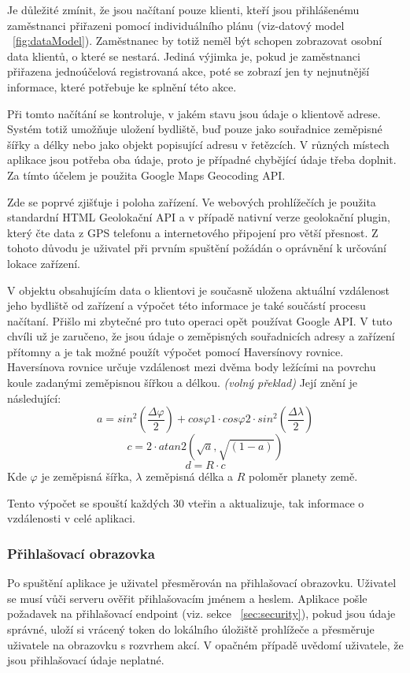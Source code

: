 \documentclass[
  glossaries,
]{kidiplom}
\begin{document}
Je důležité zmínit, že jsou načítaní pouze klienti, kteří jsou přihlášenému zaměstnanci přiřazeni pomocí individuálního plánu (viz-datový model ~\ref{fig:dataModel}). Zaměstnanec by totiž neměl být schopen zobrazovat osobní data klientů, o které se nestará. Jediná výjimka je, pokud je zaměstnanci přiřazena jednoúčelová registrovaná akce, poté se zobrazí jen ty nejnutnější informace, které potřebuje ke splnění této akce.

Při tomto načítání se kontroluje, v jakém stavu jsou údaje o klientově adrese. Systém totiž umožňuje uložení bydliště, buď pouze jako souřadnice zeměpisné šířky a délky nebo jako objekt popisující adresu v řetězcích. V různých místech aplikace jsou potřeba oba údaje, proto je případné chybějící údaje třeba doplnit. Za tímto účelem je použita Google Maps Geocoding API. 

Zde se poprvé zjišťuje i poloha zařízení. Ve webových prohlížečích je použita standardní HTML Geolokační API a v případě nativní verze geolokační plugin, který čte data z GPS telefonu a internetového připojení pro větší přesnost. Z tohoto důvodu je uživatel při prvním spuštění požádán o oprávnění k určování lokace zařízení.

V objektu obsahujícím data o klientovi je současně uložena aktuální vzdálenost jeho bydliště od zařízení a výpočet této informace je také součástí procesu načítaní. Přišlo mi zbytečné pro tuto operaci opět používat Google API. V tuto chvíli už je zaručeno, že jsou údaje o zeměpisných souřadnicích adresy a zařízení přítomny a je tak možné použít výpočet pomocí Haversínovy rovnice. Haversínova rovnice určuje vzdálenost mezi dvěma body ležícími na povrchu koule zadanými zeměpisnou šířkou a délkou. \cite{16} \textit{(volný překlad)} Její znění \cite{17} je následující:
$$a = sin^2(\frac{\Delta\varphi}{2}) + cos\varphi1 \cdot cos\varphi2 \cdot sin^2(\frac{\Delta\lambda}{2})$$
$$c = 2 \cdot atan2(\sqrt{a},\sqrt{(1 - a)})$$
$$ d = R \cdot c$$
Kde $\varphi$ je zeměpisná šířka, $\lambda$ zeměpisná délka a $R$ poloměr planety země.

 Tento výpočet se spouští každých 30 vteřin a aktualizuje, tak informace o vzdálenosti v celé aplikaci.

\subsubsection{Přihlašovací obrazovka}
Po spuštění aplikace je uživatel přesměrován na přihlašovací obrazovku. Uživatel se musí  vůči serveru ověřit přihlašovacím jménem a heslem. Aplikace pošle požadavek na přihlašovací endpoint (viz. sekce ~\ref{sec:security}), pokud jsou údaje správné, uloží si vrácený token do lokálního úložiště prohlížeče a přesměruje uživatele na obrazovku s rozvrhem akcí. V opačném případě uvědomí uživatele, že jsou přihlašovací údaje neplatné.
  
\end{document}
